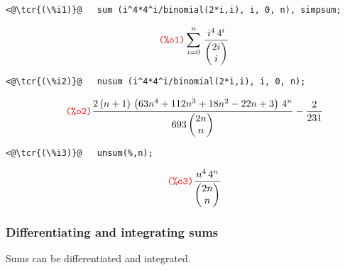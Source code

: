 \documentclass[../Maxima_Workbook.tex]{subfiles}
\begin{document}
\lz \begin{small}
\color{blue} \leqn
\begin{lstlisting}
<@\tcr{(\%i1)}@   sum (i^4*4^i/binomial(2*i,i), i, 0, n), simpsum;
\end{lstlisting}
\vspace{-4mm} \[\tag*{\tcr{\ttfamily (\%o1)}} \sum_{i=0}^{n}{\left. \frac{{{i}^{4}}\, {{4}^{i}}}{\begin{pmatrix}2 i\\
		i\end{pmatrix}}\right.} \]
\vspace{-5mm} \begin{lstlisting}
<@\tcr{(\%i2)}@   nusum (i^4*4^i/binomial(2*i,i), i, 0, n);
\end{lstlisting}
\vspace{-4mm} \[\tag*{\tcr{\ttfamily (\%o2)}} \frac{2 \left( n+1\right) \, \left( 63 {{n}^{4}}+112 {{n}^{3}}+18 {{n}^{2}}-22 n+3\right) \, {{4}^{n}}}{693 \begin{pmatrix}2 n\\
	n\end{pmatrix}}-\frac{2}{231} \]
\vspace{-5mm} \begin{lstlisting}
<@\tcr{(\%i3)}@   unsum(%,n);
\end{lstlisting}
\vspace{-4mm} \[\tag*{\tcr{\ttfamily (\%o3)}} \frac{{{n}^{4}}\, {{4}^{n}}}{\begin{pmatrix}2 n\\
	n\end{pmatrix}} \]
\color{black} \reqn
\end{small} \vspace{-4mm}

\subsubsection{Differentiating and integrating sums}

Sums can be differentiated and integrated.
\end{document}
